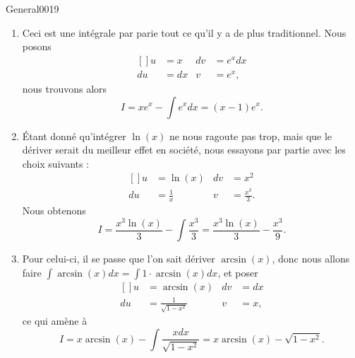 \begin{corrige}{General0019}

\begin{enumerate}
\item
Ceci est une intégrale par parie tout ce qu'il y a de plus traditionnel. Nous posons
\begin{equation}
	\begin{aligned}[]
		u&=x	&	dv&= e^{x}dx\\
		du&=dx	&	v&=e^x,
	\end{aligned}
\end{equation}
nous trouvons alors
\begin{equation}
	I=xe^x-\int e^{x}dx=(x-1)e^x.
\end{equation}

\item
Étant donné qu'intégrer $\ln(x)$ ne nous ragoute pas trop, mais que le dériver serait du meilleur effet en société, nous essayons par partie avec les choix suivants :
\begin{equation}
	\begin{aligned}[]
		u&=\ln(x)		&	dv&=x^2\\
		du&=\frac{1}{ x }	&	v&=\frac{ x^3 }{ 3 }.
	\end{aligned}
\end{equation}
Nous obtenons
\begin{equation}
	I=\frac{ x^3\ln(x) }{ 3 }-\int\frac{ x^3 }{ 3 }=\frac{ x^3\ln(x) }{ 3 }-\frac{ x^3 }{ 9 }.
\end{equation}

\item
Pour celui-ci, il se passe que l'on sait dériver $\arcsin(x)$, donc nous allons faire $\int\arcsin(x)dx=\int 1\cdot\arcsin(x)dx$, et poser
\begin{equation}
	\begin{aligned}[]
		u&=\arcsin(x)		&	dv&=dx\\
		du&=\frac{1}{ \sqrt{1-x^2} }	&	v&=x,
	\end{aligned}
\end{equation}
ce qui amène à
\begin{equation}
	I=x\arcsin(x)-\int\frac{ xdx }{ \sqrt{1-x^2} }=x\arcsin(x)-\sqrt{1-x^2}.
\end{equation}


\end{enumerate}
\end{corrige}
